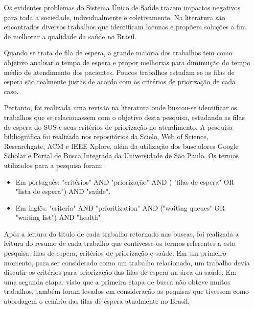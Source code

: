 Os evidentes problemas do Sistema Único de Saúde trazem impactos negativos para toda a sociedade, individualmente e coletivamente. Na literatura são encontrados diversos trabalhos que identificam lacunas e propõem soluções a fim de melhorar a qualidade da saúde no Brasil. 

Quando se trata de fila de espera, a grande maioria dos trabalhos tem como objetivo analisar o tempo de espera e propor melhorias para diminuição do tempo médio de atendimento dos pacientes. Poucos trabalhos estudam se as filas de espera são realmente justas de acordo com os critérios de priorização de cada caso.

Portanto, foi realizada uma revisão na literatura onde buscou-se identificar os trabalhos que se relacionassem com o objetivo desta pesquisa, estudando as filas de espera do SUS e seus critérios de priorização no atendimento. A pesquisa bibliográfica foi realizada nos repositórios da Scielo, Web of Science, Researchgate, ACM e IEEE Xplore, além da utilização dos buscadores Google Scholar e Portal de Busca Integrada da Universidade de São Paulo. Os termos utilizados para a pesquisa foram:

\begin{itemize}
    	\item Em português: "critérios" AND "priorização" AND ( "filas de espera" OR "lista de espera") AND "saúde".
        \item Em inglês: "criteria" AND "prioritization" AND ("waiting queues" OR "waiting list") AND "health"
\end{itemize}

Após a leitura do titulo de cada trabalho retornado nas buscas, foi realizada a leitura do resumo de cada trabalho que contivesse os termos referentes a esta pesquisa: filas de espera, critérios de priorização e saúde. Em um primeiro momento, para ser considerado como um trabalho relacionado, um trabalho devia discutir os critérios para priorização das filas de espera na área da saúde. Em uma segunda etapa, visto que a primeira etapa de busca não obteve muitos trabalhos, também foram levados em consideração as pequisas que tivessem como abordagem o cenário das filas de espera atualmente no Brasil.

